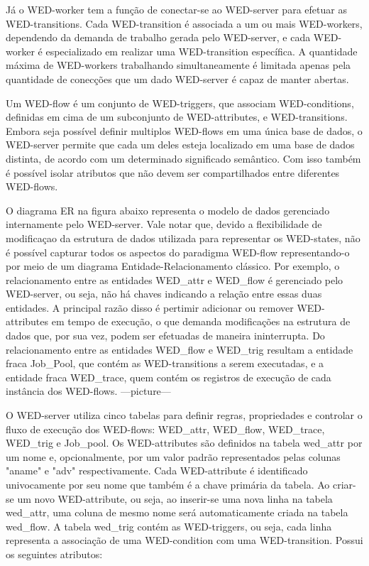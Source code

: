   Já o WED-worker tem a função de conectar-se ao WED-server para efetuar as WED-transitions. Cada WED-transition é associada
a um ou mais WED-workers, dependendo da demanda de trabalho gerada pelo WED-server, e cada WED-worker é especializado
em realizar uma WED-transition específica. A quantidade máxima de WED-workers trabalhando simultaneamente é limitada
apenas pela quantidade de conecções que um dado WED-server é capaz de manter abertas.
  
  Um WED-flow é um conjunto de WED-triggers, que associam WED-conditions, definidas em cima de 
um subconjunto de WED-attributes, e WED-transitions.
  Embora seja possível definir multiplos WED-flows em uma única base de dados, o WED-server permite que cada um deles 
esteja localizado em uma base de dados distinta, de acordo com um determinado significado semântico. Com isso também é 
possível isolar atributos que não devem ser compartilhados entre diferentes WED-flows. 
  
  O diagrama ER na figura abaixo representa o modelo de dados gerenciado internamente pelo WED-server. Vale notar que, devido
a flexibilidade de modificaçao da estrutura de dados utilizada para representar os WED-states, não é possível capturar todos
os aspectos do paradigma WED-flow representando-o por meio de um diagrama Entidade-Relacionamento clássico. Por exemplo,
o relacionamento entre as entidades WED_attr e WED_flow é gerenciado pelo WED-server, ou seja, não há chaves indicando
a relação entre essas duas entidades. A principal razão disso é pertimir adicionar ou remover WED-attributes em tempo de execução, 
o que demanda modificações na estrutura de dados que, por sua vez, podem ser efetuadas de maneira ininterrupta.
  Do relacionamento entre as entidades WED_flow e WED_trig resultam a entidade fraca Job_Pool, que contém as WED-transitions
a serem executadas, e a entidade fraca WED_trace, quem contém os registros de execução de cada instância dos WED-flows.
  ---picture---
  
  O WED-server utiliza cinco tabelas para definir regras, propriedades e controlar o fluxo de execução dos WED-flows: WED_attr,
WED_flow, WED_trace, WED_trig e Job_pool.
  Os WED-attributes são definidos na tabela wed_attr por um nome e, opcionalmente, por um valor padrão representados 
pelas colunas "aname" e "adv" respectivamente. Cada WED-attribute é identificado univocamente por seu nome que também é 
a chave primária da tabela. Ao criar-se um novo WED-attribute, ou seja, ao inserir-se uma nova linha na tabela wed_attr, 
uma coluna de mesmo nome será automaticamente criada na tabela wed_flow.
  A tabela wed_trig contém as WED-triggers, ou seja, cada linha representa a associação de uma WED-condition com uma 
WED-transition. Possui os seguintes atributos:

